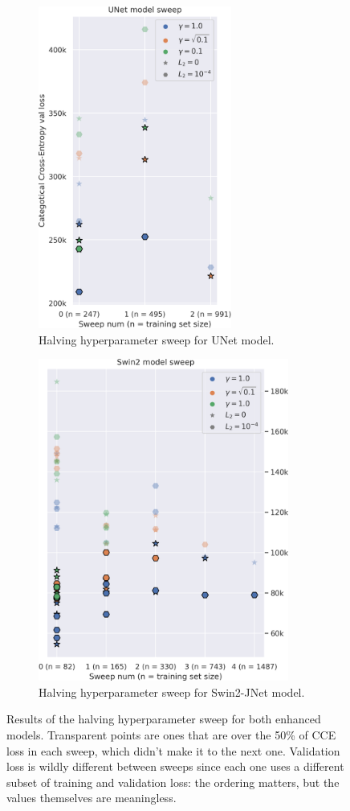 \vfill{}

\begin{figure}[h]
	\begin{subfigure}[t]{.35\textwidth}
		\includegraphics[height=300pt]{unet_sweep.png}
		\caption{Halving hyperparameter sweep for UNet model.}
		\label{unet_param_sweep}
	\end{subfigure} \hfill{}
	\begin{subfigure}[t]{.65\textwidth}
		\hfill{}
		\includegraphics[height=300pt]{swin2_sweep.png}
		\caption{Halving hyperparameter sweep for Swin2-JNet model.}
		\label{swin2_param_sweep}
	\end{subfigure}
	\caption{Results of the halving hyperparameter sweep for both enhanced models. Transparent points are ones that are over the 50\% of CCE loss in each sweep, which didn't make it to the next one. Validation loss is wildly different between sweeps since each one uses a different subset of training and validation loss: the ordering matters, but the values themselves are meaningless.}
	\label{param_sweep}
\end{figure}

